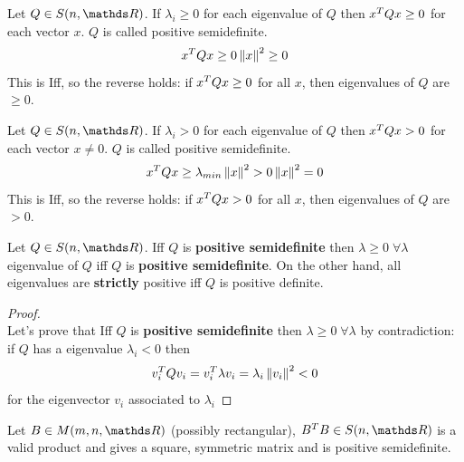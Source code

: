 \documentclass[computational_mathematics.tex]{subfiles}
\begin{document}
\begin{definition}
  Let $Q \in S(n, \R)$. If $\lambda_i \geq 0$ for each eigenvalue of $Q$ then ${x}^{T} Q x \ge 0$ for each vector $x$. $Q$ is called positive semidefinite.
  $$ {x}^{T} Q x \ge 0\left\lVert x\right\rVert^2 \geq 0$$
  This is Iff, so the reverse holds: if ${x}^{T} Q x \ge 0$ for all $x$, then eigenvalues of $Q$ are $\geq 0$.
  \end{definition}

\begin{definition}
    Let $Q \in S(n, \R)$. If $\lambda_i > 0$ for each eigenvalue of $Q$ then ${x}^{T} Q x > 0$ for each vector $x \neq 0$. $Q$ is called positive semidefinite.
    $$ {x}^{T} Q x \ge \lambda_{min}\left\lVert x\right\rVert^2 > 0\left\lVert x\right\rVert^2 = 0$$
    This is Iff, so the reverse holds: if ${x}^{T} Q x > 0$ for all $x$, then eigenvalues of $Q$ are $> 0$.

\end{definition}

\begin{proposition}
  Let $Q \in S(n, \R)$. Iff $Q$ is \textbf{positive semidefinite} then $\lambda \ge 0 \; \forall \lambda$ eigenvalue of $Q$ iff $Q$ is \textbf{positive semidefinite}. On the other hand, all eigenvalues are \textbf{strictly} positive iff $Q$ is positive definite.
\end{proposition}

\begin{proof}~\\
Let's prove that Iff $Q$ is \textbf{positive semidefinite} then $\lambda \ge 0 \; \forall \lambda$ by contradiction:\\
if $Q$ has a eigenvalue $\lambda_i < 0$ then 
$$ v_i^TQv_i = v_i^T \lambda v_i = \lambda_i\left\lVert v_i\right\rVert^2 < 0$$
for the eigenvector $v_i$ associated to $\lambda_i$
  

\end{proof}

\begin{proposition}
  Let $B \in M(m, n, \R)$ (possibly rectangular), $\tr{B} B \in S(n, \R)$ is a valid product
and gives a square, symmetric matrix and is positive semidefinite.
\end{proposition}
\end{document}
